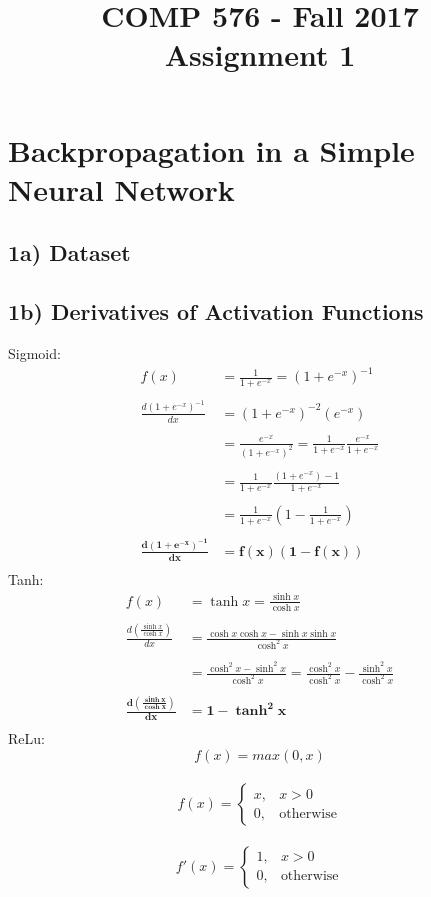 \documentclass{article}
\title{COMP 576 - Fall 2017\\ Assignment 1}
\begin{document}
\maketitle
{}

\section*{Backpropagation in a Simple Neural Network}

\subsection*{1a) Dataset}

\subsection*{1b) Derivatives of Activation Functions}
Sigmoid: 
	\begin{align*}
		f(x) &= \frac{1}{1+e^{-x}} = (1+e^{-x})^{-1}\\ \\
		\frac{d(1+e^{-x})^{-1}}{dx} &= (1+e^{-x})^{-2} (e^{-x})\\\\
		&=\frac{e^{-x}}{(1+e^{-x})^{2}} = \frac{1}{1+e^{-x}}\frac{e^{-x}}{1+e^{-x}}\\\\
		&=\frac{1}{1+e^{-x}}\frac{(1+e^{-x}) - 1}{1+e^{-x}}\\\\
		&= \frac{1}{1+e^{-x}}\left (1 - \frac{ 1}{1+e^{-x}}\right)\\\\
		\boldsymbol{\frac{d(1+e^{-x})^{-1}}{dx}} &\boldsymbol{= f(x)(1-f(x))}\\
	\end{align*}
Tanh:
	\begin{align*}
		f(x) &= \tanh{x} = \frac{\sinh{x}}{\cosh{x}}\\ \\
		\frac{d\left(\frac{\sinh{x}}{\cosh{x}}\right)}{dx}&= \frac{\cosh{x}\cosh{x} - \sinh{x}\sinh{x}}{\cosh^{2}{x}}\\\\
		&= \frac{\cosh^{2}{x}-\sinh^{2}{x}}{\cosh^{2}{x}} = \frac{\cosh^{2}{x}}{\cosh^{2}{x}} -  \frac{\sinh^{2}{x}}{\cosh^{2}{x}}\\\\
		\boldsymbol{\frac{d\left(\frac{\sinh{x}}{\cosh{x}}\right)}{dx}}& \boldsymbol{=1-\tanh^{2}{x}}\\
	\end{align*}
ReLu:
	\begin{equation*}
		f(x) = max(0,x)
	\end{equation*}
\\
	\[
		f(x) = 
			\begin{cases}
				x, & x> 0\\
				0, & \text {otherwise}
			\end{cases}
	\]
\\
	\[
		f'(x) = 
			\begin{cases}
				1, & x> 0\\
				0, & \text {otherwise}
			\end{cases}
	\]
\end{document}

